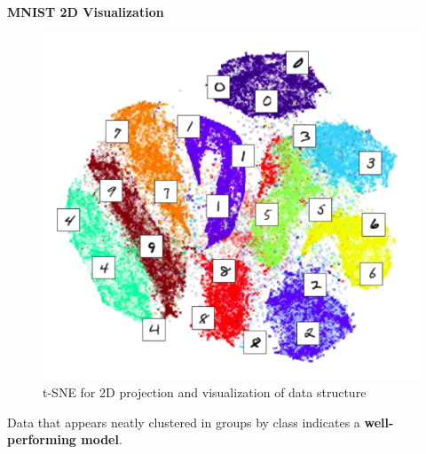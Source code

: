 \newpage

\textbf{MNIST 2D Visualization}

\begin{figure}[h!t]
    \centering
    \includegraphics[width=0.4\linewidth]{2ddatavis.png}
    \caption{t-SNE for 2D projection and
visualization of data structure}
    \label{fig:enter-label}
\end{figure}

\begin{idea}
    Data that appears neatly clustered in groups by class indicates a \textbf{well-performing model}.
\end{idea}